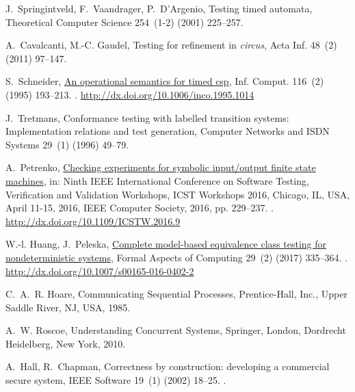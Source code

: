 \documentclass[3p,times]{elsarticle}
\begin{document}
\begin{thebibliography}{10}
J.~Springintveld, F.~Vaandrager, P.~D'Argenio, Testing timed automata,
  Theoretical Computer Science 254~(1-2) (2001) 225--257.

A.~Cavalcanti, M.-C. Gaudel, Testing for refinement in {\it circus}, Acta Inf.
  48~(2) (2011) 97--147.

S.~Schneider, \href{http://dx.doi.org/10.1006/inco.1995.1014}{An operational
  semantics for timed csp}, Inf. Comput. 116~(2) (1995) 193--213.
\newblock \href {http://dx.doi.org/10.1006/inco.1995.1014}
  {}.
\newline\urlprefix\url{http://dx.doi.org/10.1006/inco.1995.1014}

J.~Tretmans, Conformance testing with labelled transition systems:
  Implementation relations and test generation, Computer Networks and ISDN
  Systems 29~(1) (1996) 49--79.

A.~Petrenko, \href{http://dx.doi.org/10.1109/ICSTW.2016.9}{Checking experiments
  for symbolic input/output finite state machines}, in: Ninth {IEEE}
  International Conference on Software Testing, Verification and Validation
  Workshops, {ICST} Workshops 2016, Chicago, IL, USA, April 11-15, 2016, {IEEE}
  Computer Society, 2016, pp. 229--237.
\newblock \href {http://dx.doi.org/10.1109/ICSTW.2016.9}
  {}.
\newline\urlprefix\url{http://dx.doi.org/10.1109/ICSTW.2016.9}

W.-l. Huang, J.~Peleska,
  \href{http://dx.doi.org/10.1007/s00165-016-0402-2}{Complete model-based
  equivalence class testing for nondeterministic systems}, Formal Aspects of
  Computing 29~(2) (2017) 335--364.
\newblock \href {http://dx.doi.org/10.1007/s00165-016-0402-2}
  {}.
\newline\urlprefix\url{http://dx.doi.org/10.1007/s00165-016-0402-2}

C.~A.~R. Hoare, Communicating Sequential Processes, Prentice-Hall, Inc., Upper
  Saddle River, NJ, USA, 1985.

A.~W. Roscoe, Understanding Concurrent Systems, Springer, London, Dordrecht
  Heidelberg, New York, 2010.

A.~Hall, R.~Chapman, Correctness by construction: developing a commercial
  secure system, IEEE Software 19~(1) (2002) 18--25.
\newblock \href {http://dx.doi.org/10.1109/52.976937}
  {}.


\end{thebibliography}
\end{document}
